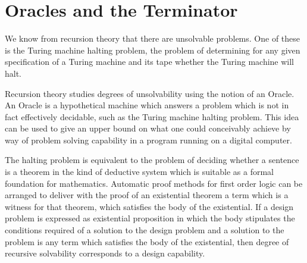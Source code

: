 \section{Oracles and the Terminator} 

We know from recursion theory that there are unsolvable problems.
One of these is the Turing machine halting problem, the problem of
determining for any given specification of a Turing machine and its
tape whether the Turing machine will halt.

Recursion theory studies degrees of unsolvability using the notion of
an Oracle.
An Oracle is a hypothetical machine which answers a problem which is
not in fact effectively decidable, such as the Turing machine halting
problem.
This idea can be used to give an upper bound on what one could
conceivably achieve by way of problem solving capability in a program
running on a digital computer.

The halting problem is equivalent to the problem of deciding whether a
sentence is a theorem in the kind of deductive system which is
suitable as a formal foundation for mathematics.
Automatic proof methods for first order logic can be arranged to
deliver with the proof of an existential theorem a term which is a
witness for that theorem, which satisfies the body of the existential.
If a design problem is expressed as existential proposition in which
the body stipulates the conditions required of a solution to the
design problem and a solution to the problem is any term which
satisfies the body of the existential, then degree of recursive
solvability corresponds to a design capability.







